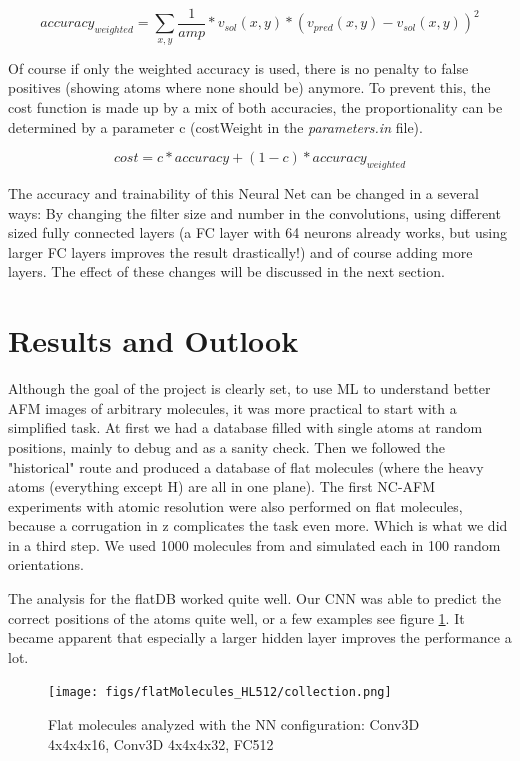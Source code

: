 \documentclass{article}
\begin{document}
\begin{equation}
accuracy_{weighted} = \sum_{x, y} \frac{1}{amp}* v_{sol}(x,y)*(v_{pred}(x,y)-v_{sol}(x,y))^2
\label{eq:acc_weighted}
\end{equation}

Of course if only the weighted accuracy is used, there is no penalty to false positives (showing atoms where none should be) anymore. To prevent this, the cost function is made up by a mix of both accuracies, the proportionality can be determined by a parameter c (costWeight in the \emph{parameters.in} file).

\begin{equation}
cost = c*accuracy + (1-c)*accuracy_{weighted}
\end{equation}

The accuracy and trainability of this Neural Net can be changed in a several ways: By changing the filter size and number in the convolutions, using different sized fully connected layers (a FC layer with 64 neurons already works, but using larger FC layers improves the result drastically!) and of course adding more layers. The effect of these changes will be discussed in the next section.


\newpage
\section{Results and Outlook}

Although the goal of the project is clearly set, to use ML to understand better AFM images of arbitrary molecules, it was more practical to start with a simplified task. At first we had a database filled with single atoms at random positions, mainly to debug and as a sanity check. Then we followed the "historical" route and produced a database of flat molecules (where the heavy atoms (everything except H) are all in one plane). The first NC-AFM experiments with atomic resolution were also performed on flat molecules, because a corrugation in z complicates the task even more. Which is what we did in a third step. We used 1000 molecules from \cite{ramakrishnan2014quantum} and simulated each in 100 random orientations.

The analysis for the flatDB worked quite well. Our CNN was able to predict the correct positions of the atoms quite well, or a few examples see figure \ref{fig:resultsflatDB}. It became apparent that especially a larger hidden layer improves the performance a lot. 

\begin{figure}[htbp]
	\begin{center}
		\texttt{[image: figs/flatMolecules\_HL512/collection.png]}

		\caption{Flat molecules analyzed with the NN configuration: Conv3D 4x4x4x16, Conv3D 4x4x4x32, FC512}
		\label{fig:resultsflatDB}
	\end{center}
\end{figure}
\end{document}

